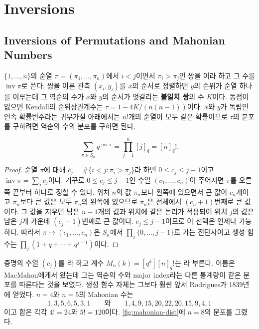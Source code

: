 \section{Inversions}
\label{sec:inversions}

\subsection{Inversions of Permutations and Mahonian Numbers}

$\{1,\dots,n\}$의 순열 $\pi=(\pi_1,\dots,\pi_n)$에서 $i<j$이면서 $\pi_i>\pi_j$인 쌍을 이라 하고 그 수를 $\operatorname{inv}\pi$로 쓴다. 쌍을 이룬 관측 $(x_i,y_i)$를 $x$의 순서로 정렬하면 $y$의 순위가 순열 하나를 이루는데 그 역순의 수가 $x$와 $y$의 순서가 엇갈리는 \textbf{불일치 쌍}의 수 $K$이다. 동점이 없으면 Kendall의 순위상관계수는 $\tau=1-4K/(n(n-1))$이다\cite{kendall1938}. $x$와 $y$가 독립인 연속 확률변수라는 귀무가설 아래에서는 $n!$개의 순열이 모두 같은 확률이므로 $\tau$의 분포를 구하려면 역순의 수의 분포를 구하면 된다.

\begin{theorem}
\label{thm:mahonian}
\[
\sum_{\pi\in S_n}q^{\operatorname{inv}\pi}=\prod_{j=1}^n[j]_q=[n]_q!.
\]
\end{theorem}

\begin{proof}
순열 $\pi$에 대해 $c_j=\#\{i<j:\pi_i>\pi_j\}$라 하면 $0\le c_j\le j-1$이고 $\operatorname{inv}\pi=\sum_jc_j$이다. 거꾸로 $0\le c_j\le j-1$인 수열 $(c_1,\dots,c_n)$이 주어지면 $\pi$를 오른쪽 끝부터 하나로 정할 수 있다. 위치 $n$의 값 $\pi_n$보다 왼쪽에 있으면서 큰 값이 $c_n$개이고 $\pi_n$보다 큰 값은 모두 $\pi_n$의 왼쪽에 있으므로 $\pi_n$은 전체에서 $(c_n+1)$번째로 큰 값이다. 그 값을 지우면 남은 $n-1$개의 값과 위치에 같은 논리가 적용되어 위치 $j$의 값은 남은 $j$개 가운데 $(c_j+1)$번째로 큰 값이다. $c_j\le j-1$이므로 이 선택은 언제나 가능하다. 따라서 $\pi\mapsto(c_1,\dots,c_n)$은 $S_n$에서 $\prod_j\{0,\dots,j-1\}$로 가는 전단사이고 생성 함수는 $\prod_j(1+q+\cdots+q^{j-1})$이다.
\end{proof}

증명의 수열 $(c_j)$를 라 하고 계수 $M_n(k)=[q^k][n]_q!$는 라 부른다. 이름은 MacMahon에게서 왔는데 그는 역순의 수와 major index라는 다른 통계량이 같은 분포를 따른다는 것을 보였다\cite{macmahon1915}. 생성 함수 자체는 그보다 훨씬 앞서 Rodrigues가 1839년에 얻었다\cite{knuth1998taocp3}. $n=4$와 $n=5$의 Mahonian 수는
\[
1,3,5,6,5,3,1\qquad\text{와}\qquad1,4,9,15,20,22,20,15,9,4,1
\]
이고 합은 각각 $4!=24$와 $5!=120$이다. \cref{fig:mahonian-dist}에 $n=8$의 분포를 그렸다.

